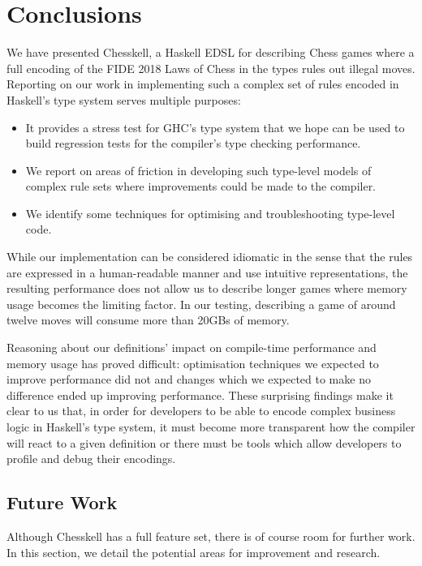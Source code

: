 \documentclass[12pt, a4paper, bibliography=totocnumbered]{scrreprt}
\begin{document}
\chapter{Conclusions}

We have presented Chesskell, a Haskell EDSL for describing Chess games where a full encoding of the FIDE 2018 Laws of Chess in the types rules out illegal moves. Reporting on our work in implementing such a complex set of rules encoded in Haskell's type system serves multiple purposes:

\begin{itemize}
    \item It provides a stress test for GHC's type system that we hope can be used to build regression tests for the compiler's type checking performance.
    \item We report on areas of friction in developing such type-level models of complex rule sets where improvements could be made to the compiler.
    \item We identify some techniques for optimising and troubleshooting type-level code.
\end{itemize}

While our implementation can be considered idiomatic in the sense that the rules are expressed in a human-readable manner and use intuitive representations, the resulting performance does not allow us to describe longer games where memory usage becomes the limiting factor. In our testing, describing a game of around twelve moves will consume more than 20GBs of memory.

Reasoning about our definitions' impact on compile-time performance and memory usage has proved difficult: optimisation techniques we expected to improve performance did not and changes which we expected to make no difference ended up improving performance. These surprising findings make it clear to us that, in order for developers to be able to encode complex business logic in Haskell's type system, it must become more transparent how the compiler will react to a given definition or there must be tools which allow developers to profile and debug their encodings.

\section{Future Work}

Although Chesskell has a full feature set, there is of course room for further work. In this section, we detail the potential areas for improvement and research.
\end{document}
